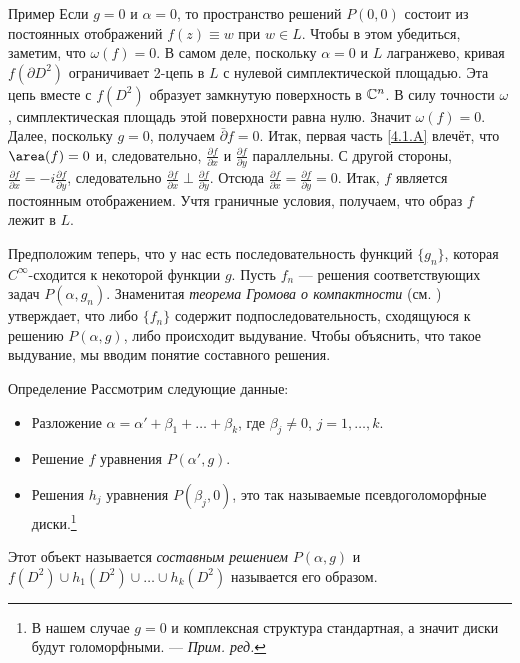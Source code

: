 \begin{ex*}{Пример}
Если $g = 0$ и $\alpha = 0$, то пространство решений $P (0, 0)$ состоит из постоянных отображений $f (z) \equiv w$ при $w \in L$.
Чтобы в этом убедиться, заметим, что $\omega (f) = 0$.
В самом деле, поскольку $\alpha = 0$ и $L$ лагранжево, кривая $f (\partial D^2)$ ограничивает 2-цепь в $L$ с нулевой симплектической площадью.
Эта цепь вместе с $f (D^2)$ образует замкнутую поверхность в $\mathbb{C}^n$.
В силу точности $\omega$, симплектическая площадь этой поверхности равна нулю.
Значит $\omega (f) = 0$.
Далее, поскольку $g = 0$, получаем $\bar\partial f=0$.
Итак, первая часть \ref{4.1.A} влечёт, что $\area (f) = 0$ и, следовательно, $\tfrac{\partial f}{\partial x}$ и $\tfrac{\partial f}{\partial y}$ параллельны.
С другой стороны, $\tfrac{\partial f}{\partial x}=-i\tfrac{\partial f}{\partial y}$,
следовательно $\tfrac{\partial f}{\partial x}\perp\tfrac{\partial f}{\partial y}$.
Отсюда $\tfrac{\partial f}{\partial x}=\tfrac{\partial f}{\partial y}=0$.
Итак, $f$ является постоянным отображением.
Учтя граничные условия, получаем, что образ $f$ лежит в $L$.
\end{ex*}

Предположим теперь, что у нас есть последовательность функций
$\{g_n\}$, которая $C^\infty$-сходится к некоторой функции $g$. 
Пусть $f_n$ — решения соответствующих задач $P(\alpha, g_n)$.
Знаменитая \emph{теорема Громова о компактности} (см. \cite{G1,AL})
утверждает, что либо $\{f_n\}$ содержит подпоследовательность,
сходящуюся к решению $P (\alpha, g)$, либо происходит выдувание.
Чтобы объяснить, что такое выдувание, мы вводим понятие составного решения. 

\begin{ex*}{Определение}
Рассмотрим следующие данные:
\begin{itemize}
\item Разложение $\alpha = \alpha' + \beta_1 +\dots + \beta_k$, где $\beta_j \ne 0$, $j = 1,\dots,k$.
\item Решение $f$ уравнения $P (\alpha', g)$.
\item Решения $h_j$ уравнения  $P (\beta_j, 0)$, это так называемые
  псевдоголоморфные диски.\footnote{В нашем случае $g=0$ и комплексная структура стандартная, а значит диски будут голоморфными. — \textit{Прим. ред.}}
\end{itemize}
Этот объект называется \emph{составным решением} $P(\alpha,g)$ и 
$f(D^2)\cup h_1(D^2) \cup\dots\cup h_k (D^2)$ называется его образом.
\end{ex*}

